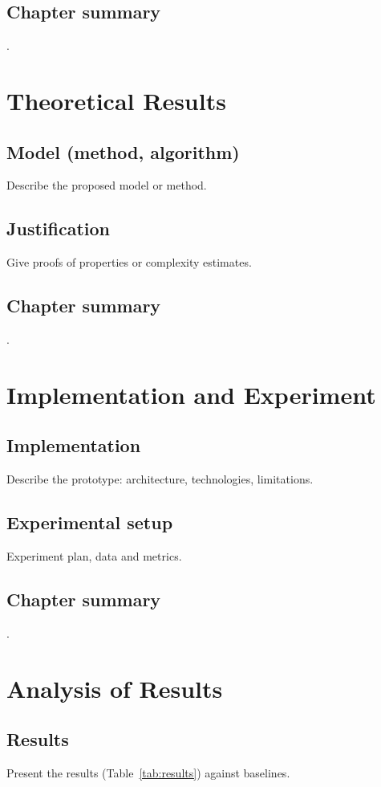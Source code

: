 \documentclass[12pt,a4paper]{extreport}
\begin{document}
\section{Chapter summary}
.

\clearpage
\chapter{Theoretical Results}
\section{Model (method, algorithm)}
Describe the proposed model or method.

\section{Justification}
Give proofs of properties or complexity estimates.

\section{Chapter summary}
.

\clearpage
\chapter{Implementation and Experiment}
\section{Implementation}
Describe the prototype: architecture, technologies, limitations.

\section{Experimental setup}
Experiment plan, data and metrics.

\section{Chapter summary}
.

\clearpage
\chapter{Analysis of Results}
\section{Results}
Present the results (Table~\ref{tab:results}) against baselines.
\end{document}
